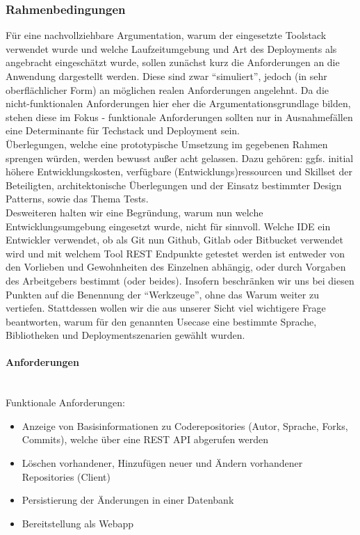 \documentclass[notitlepage, hidelinks]{article}
\begin{document}
\subsubsection{Rahmenbedingungen}
 
Für eine nachvollziehbare Argumentation, warum der eingesetzte Toolstack verwendet wurde und welche Laufzeitumgebung und Art des Deployments als angebracht eingeschätzt wurde, sollen zunächst kurz die Anforderungen an die Anwendung dargestellt werden. Diese sind zwar ``simuliert'', jedoch (in sehr oberflächlicher Form) an möglichen realen Anforderungen angelehnt. Da die nicht-funktionalen Anforderungen hier eher die Argumentationsgrundlage bilden, stehen diese im Fokus - funktionale Anforderungen sollten nur in Ausnahmefällen eine Determinante für Techstack und Deployment sein.  \\
Überlegungen, welche eine prototypische Umsetzung im gegebenen Rahmen sprengen würden, werden bewusst außer acht gelassen. Dazu gehören: ggfs. initial höhere Entwicklungskosten, verfügbare (Entwicklungs)ressourcen und Skillset der Beteiligten, architektonische Überlegungen und der Einsatz bestimmter Design Patterns, sowie das Thema Tests. \\
Desweiteren halten wir eine Begründung, warum nun welche Entwicklungsumgebung eingesetzt wurde, nicht für sinnvoll. Welche IDE ein Entwickler verwendet, ob als Git nun Github, Gitlab oder Bitbucket verwendet wird und mit welchem Tool REST Endpunkte getestet werden ist entweder von den Vorlieben und Gewohnheiten des Einzelnen abhängig, oder durch Vorgaben des Arbeitgebers bestimmt (oder beides). Insofern beschränken wir uns bei diesen Punkten auf die Benennung der ``Werkzeuge'', ohne das Warum weiter zu vertiefen. Stattdessen wollen wir die aus unserer Sicht viel wichtigere Frage beantworten, warum für den genannten Usecase eine bestimmte Sprache, Bibliotheken und Deploymentszenarien gewählt wurden.
 
\paragraph{Anforderungen} \mbox{} \\

Funktionale Anforderungen:
\begin{itemize}
\item Anzeige von Basisinformationen zu Coderepositories (Autor, Sprache, Forks, Commits), welche über eine REST API abgerufen werden
\item Löschen vorhandener, Hinzufügen neuer und Ändern vorhandener Repositories (Client)
\item Persistierung der Änderungen in einer Datenbank
\item Bereitstellung als Webapp
\end{itemize}
\end{document}
